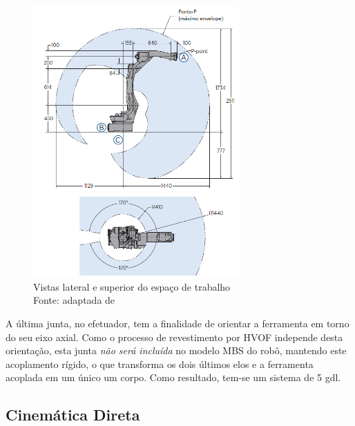 \begin{figure}[h]
	\centering 
 	\includegraphics[width=0.7\textwidth]{figs/workspace}
 	\caption[Vistas lateral e superior do espaço de trabalho]{Vistas lateral e
 	superior do espaço de trabalho \\Fonte: adaptada de~\cite{manualmh12}}
 	\label{fig::workspace}
\end{figure}


A última junta, no efetuador, tem a finalidade de orientar a ferramenta em torno
do seu eixo axial. Como o processo de revestimento por HVOF independe desta
orientação, esta junta \emph{não será incluída} no modelo MBS do robô, mantendo
este acoplamento rígido, o que transforma os dois últimos elos e a ferramenta
acoplada em um único um corpo. Como resultado, tem-se um sistema de 5 gdl.


\subsection{Cinemática Direta}\label{sec::dkin}

